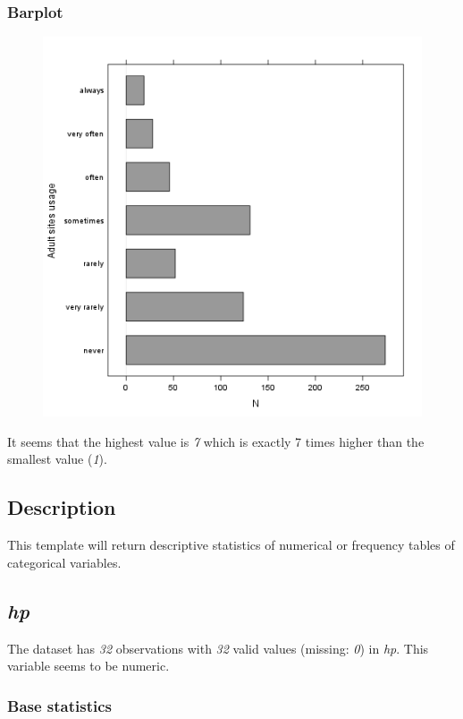 \documentclass{article}
\makeatletter
\def\maxwidth{\ifdim\Gin@nat@width>\linewidth\linewidth
\else\Gin@nat@width\fi}
\let\Oldincludegraphics\includegraphics
\renewcommand{\includegraphics}[1]{\Oldincludegraphics[width=\maxwidth]{#1}}
\makeatother
\begin{document}
\subsubsection{Barplot}

\begin{figure}[htbp]
\centering
\includegraphics{4fda8cf992e8de93624c45ef3c72a0c5.png}
\caption{}
\end{figure}

It seems that the highest value is \emph{7} which is exactly 7 times
higher than the smallest value (\emph{1}).

\subsection{Description}

This template will return descriptive statistics of numerical or
frequency tables of categorical variables.

\subsection{\emph{hp}}

The dataset has \emph{32} observations with \emph{32} valid values
(missing: \emph{0}) in \emph{hp}. This variable seems to be numeric.

\subsubsection{Base statistics}
\end{document}

